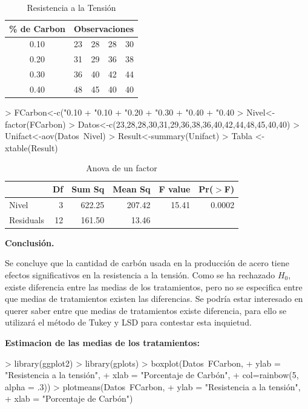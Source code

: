 \documentclass[12pt,letterpaper]{report}
\begin{document}
\begin{table}[htb]
\centering
\begin{tabular}{||c|c|c|c|c||}
\hline
\hline
\% de Carbon  & \multicolumn{4}{c||}{Observaciones} \\
\hline
0.10 &23&28&28&30 \\
\hline
0.20 &31&29&36&38 \\
\hline
0.30 &36&40&42&44 \\
\hline
0.40 &48&45&40&40 \\
\hline
\hline

\end{tabular}
\caption{Resistencia a la Tensión}
\end{table}

\begin{Schunk}
\begin{Sinput}
> FCarbon<-c("0.10%
+            "0.10%
+            "0.20%
+            "0.30%
+            "0.40%
+            "0.40%
> Nivel<-factor(FCarbon)
> Datos<-c(23,28,28,30,31,29,36,38,36,40,42,44,48,45,40,40)
> Unifact<-aov(Datos~Nivel)
> Result<-summary(Unifact)
> Tabla <- xtable(Result)
\end{Sinput}
\end{Schunk}

\begin{table}[ht]
\centering
\begin{tabular}{lrrrrr}
  \hline
 & Df & Sum Sq & Mean Sq & F value & Pr($>$F) \\ 
  \hline
Nivel       & 3 & 622.25 & 207.42 & 15.41 & 0.0002 \\ 
  Residuals   & 12 & 161.50 & 13.46 &  &  \\ 
   \hline
\end{tabular}
\caption{Anova de un factor}
\end{table}
\newpage
\textbf{Conclusión.}

Se concluye que la cantidad de carbón usada en la producción de acero tiene efectos
significativos en la resistencia a la tensión.
Como se ha rechazado $H_0$, existe diferencia entre las medias de los tratamientos, pero no
se especifica entre que medias de tratamientos existen las diferencias.
Se podría estar interesado en querer saber entre que medias de tratamientos existe
diferencia, para ello se utilizará el método de Tukey y LSD para contestar esta inquietud.

\textbf{Estimacion de las medias de los tratamientos:}
\begin{Schunk}
\begin{Sinput}
> library(ggplot2)
> library(gplots)
> boxplot(Datos~FCarbon,
+         ylab = "Resistencia a la tensión",
+         xlab = "Porcentaje de Carbón",
+         col=rainbow(5, alpha = .3))
> plotmeans(Datos~FCarbon,
+           ylab = "Resistencia a la tensión",
+           xlab = "Porcentaje de Carbón")
\end{Sinput}
\end{Schunk}
\end{document}
